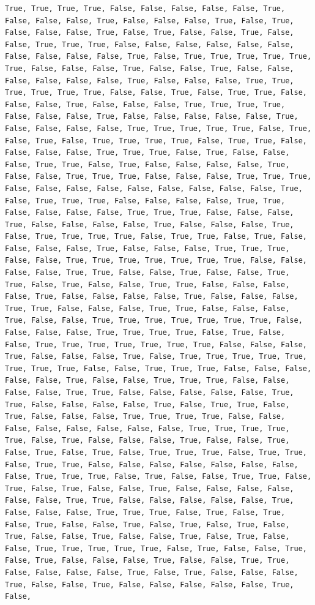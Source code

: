 \documentclass[
  letterpaper,
  DIV=11,
  numbers=noendperiod]{scrartcl}
\begin{document}
\begin{verbatim}
True, True, True, True, False, False, False, False, False, True, False, False, False, True, False, False, False, True, False, True, False, False, False, True, False, True, False, False, True, False, False, True, True, True, False, False, False, False, False, False, False, False, False, False, True, False, True, True, True, True, True, True, False, False, False, True, False, False, True, False, False, False, False, False, False, True, False, False, False, True, True, True, True, True, True, False, False, True, False, True, True, False, False, False, True, False, False, False, True, True, True, True, False, False, False, True, False, False, False, False, False, True, False, False, False, False, True, True, True, True, True, False, True, False, True, False, True, True, True, True, False, True, True, False, False, False, False, True, True, True, False, True, False, False, False, True, True, False, True, False, False, False, False, True, False, False, True, True, True, False, False, False, True, True, True, False, False, False, False, False, False, False, False, False, True, False, True, True, True, False, False, False, False, True, True, False, False, False, False, True, True, True, False, False, False, True, False, False, False, False, True, False, False, False, True, False, True, True, True, True, False, True, True, False, True, False, False, False, False, True, False, False, False, True, True, True, False, False, True, True, True, True, True, True, True, False, False, False, False, True, True, False, False, True, False, False, True, True, False, True, False, False, True, True, False, False, False, False, True, False, False, False, False, True, False, False, False, True, True, False, False, False, True, True, False, False, False, True, False, False, True, True, True, True, True, True, True, False, False, False, False, True, True, True, True, False, True, False, False, True, True, True, True, True, True, True, False, False, False, True, False, False, False, True, False, True, True, True, True, True, True, True, True, False, False, True, True, True, False, False, False, False, False, True, False, False, True, True, True, False, False, False, False, True, True, False, False, False, False, False, True, True, False, False, False, False, True, False, True, True, False, True, False, False, False, True, True, True, True, False, False, False, False, False, False, False, False, True, True, True, True, True, False, True, False, False, False, True, False, False, True, False, True, False, True, False, True, True, True, False, True, True, False, True, True, False, False, False, False, False, False, False, False, True, True, True, False, True, False, False, True, True, False, True, False, True, False, False, True, False, False, False, False, False, False, True, True, False, False, False, False, False, True, False, False, False, True, True, True, False, True, False, True, False, True, False, False, True, False, True, False, True, False, True, False, False, True, False, False, True, False, True, False, False, True, True, True, True, True, False, True, False, False, True, False, True, False, False, False, True, False, False, True, True, False, False, False, False, True, False, True, False, False, False, True, False, False, True, False, False, False, False, False, True, False, 
\end{verbatim}
\end{document}
